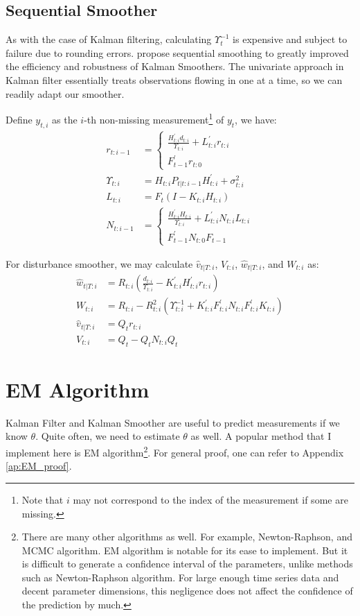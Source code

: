 \documentclass[12pt]{article}
\numberwithin{equation}{section}
\begin{document}
\subsection{Sequential Smoother}
As with the case of Kalman filtering, calculating $\Upsilon_t^{-1}$ is expensive and subject to failure due to rounding errors. \cite{durbin_koopman_2000} propose sequential smoothing to greatly improved the efficiency and robustness of Kalman Smoothers. The univariate approach in Kalman filter essentially treats observations flowing in one at a time, so we can readily adapt our smoother.

Define $y_{t,i}$ as the $i$-th non-missing measurement\footnote{Note that $i$ may not correspond to the index of the measurement if some are missing.} of $y_t$, we have:
\begin{align}
    r_{t:i-1} &= \begin{cases}
        \frac{H_{t:i}^{'}d_{t:i}}{\Upsilon_{t:i}} + L_{t:i}^{'}r_{t:i} \\
        F_{t-1}^{'}r_{t:0} 
    \end{cases} \label{eq:seq_r} \\
    \Upsilon_{t:i} &= H_{t:i}P_{t|t:i-1}H_{t:i}^{'}+\sigma_{t:i}^2 \nonumber \\
    L_{t:i} &= F_t(I-K_{t:i}H_{t:i}) \nonumber \\
    N_{t:i-1} &= \begin{cases}
        \frac{H_{t:i}^{'}H_{t:i}}{\Upsilon_{t:i}} + L_{t:i}^{'}N_{t:i}L_{t:i} \\
        F_{t-1}^{'}N_{t:0}F_{t-1}
    \end{cases} \label{eq:N_seq}
\end{align}

For disturbance smoother, we may calculate $\hat{v}_{t|T:i}$, $V_{t:i}$, $\hat{w}_{t|T:i}$, and $W_{t:i}$ as:
\begin{align}
    \hat{w}_{t|T:i} &= R_{t:i}(\frac{d_{t:i}}{\Upsilon_{t:i}}-K_{t:i}^{'}H_{t:i}^{'}r_{t:i}) \\
    W_{t:i} &= R_{t:i} - R_{t:i}^2(\Upsilon_{t:i}^{-1}+K_{t:i}^{'}F_{t:i}^{'}N_{t:i}F_{t:i}^{'}K_{t:i})  \\
    \hat{v}_{t|T:i} &= Q_tr_{t:i} \\
    V_{t:i} &= Q_t - Q_tN_{t:i}Q_t
\end{align}

\section{EM Algorithm} \label{sec:EM}
Kalman Filter and Kalman Smoother are useful to predict measurements if we know $\theta$. Quite often, we need to estimate $\theta$ as well. A popular method that I implement here is EM algorithm\footnote{There are many other algorithms as well. For example, Newton-Raphson, and MCMC algorithm. EM algorithm is notable for its ease to implement. But it is difficult to generate a confidence interval of the parameters, unlike methods such as Newton-Raphson algorithm. For large enough time series data and decent parameter dimensions, this negligence does not affect the confidence of the prediction by much.}. For general proof, one can refer to Appendix \ref{ap:EM_proof}.
\end{document}
